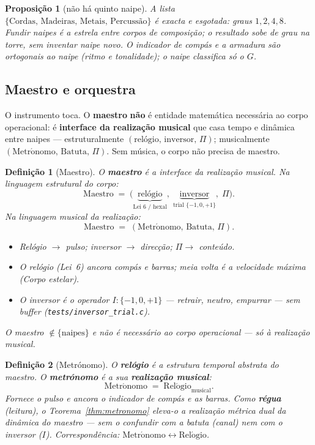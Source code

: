 \documentclass[11pt,a4paper]{article}
\newtheorem{definicao}{Definição}
\newtheorem{proposicao}{Proposição}
\newcommand{\code}[1]{\texttt{#1}}
\begin{document}
\begin{proposicao}[não há quinto naipe]\label{prop:quatro-naipes}
A lista $\{\text{Cordas},\,\text{Madeiras},\,\text{Metais},\,\text{Percussão}\}$
é exacta e esgotada: graus $1,2,4,8$. Fundir naipes é a estrela entre
corpos de composição; o resultado sobe de grau na torre, sem inventar
naipe novo. O indicador de compás e a armadura são ortogonais ao naipe
(ritmo e tonalidade); o naipe classifica só o $G$.
\end{proposicao}

\subsection*{Maestro e orquestra}

O instrumento toca. O \textbf{maestro} \textbf{não} é entidade
matemática necessária ao corpo operacional: é
\textbf{interface da realização musical}
que casa tempo e dinâmica entre naipes --- estruturalmente
$(\mathrm{relógio},\,\mathrm{inversor},\,\Pi)$; musicalmente
$(\mathrm{Metr\acute{o}nomo},\,\mathrm{Batuta},\,\Pi)$.
Sem música, o corpo não precisa de maestro.

\begin{definicao}[Maestro]\label{def:maestro}
O \textbf{maestro} é a interface da realização musical. Na linguagem
estrutural do corpo:
\[
\mathrm{Maestro}
\;=\;
\bigl(\underbrace{\text{relógio}}_{\text{Lei~6 / hexal}},\;
\underbrace{\text{inversor}}_{\text{trial }\{-1,0,+1\}},\;
\Pi\bigr).
\]
Na linguagem musical da realização:
\[
\boxed{
\mathrm{Maestro}
\;=\;
(\mathrm{Metr\acute{o}nomo},\,\mathrm{Batuta},\,\Pi).
}
\]
\begin{itemize}
\item Relógio $\to$ pulso; inversor $\to$ direcção; $\Pi\to$ conteúdo.
\item O relógio (Lei~6) ancora compás e barras; meia volta é a
velocidade máxima (\emph{Corpo estelar}).
\item O inversor é o operador $I\colon\{-1,0,+1\}$ --- retrair, neutro,
empurrar --- sem buffer (\code{tests/inversor\_trial.c}).
\end{itemize}
O maestro $\notin\{\text{naipes}\}$ e não é necessário ao corpo
operacional --- só à realização musical.
\end{definicao}

\begin{definicao}[Metrónomo]\label{def:metronomo}
O \textbf{relógio} é a estrutura temporal abstrata do maestro.
O \textbf{metrónomo} é a sua \textbf{realização musical}:
\[
\boxed{
\mathrm{Metr\acute{o}nomo}
\;=\;
\mathrm{Rel\acute{o}gio}_{\mathrm{musical}}.
}
\]
Fornece o pulso e ancora o indicador de compás e as barras.
Como \textbf{régua} (leitura), o Teorema~\ref{thm:metronomo} eleva-o
a realização métrica dual da dinâmica do maestro --- sem o confundir
com a batuta (canal) nem com o inversor ($I$).
Correspondência: $\mathrm{Metr\acute{o}nomo}\leftrightarrow\mathrm{Rel\acute{o}gio}$.
\end{definicao}
\end{document}
